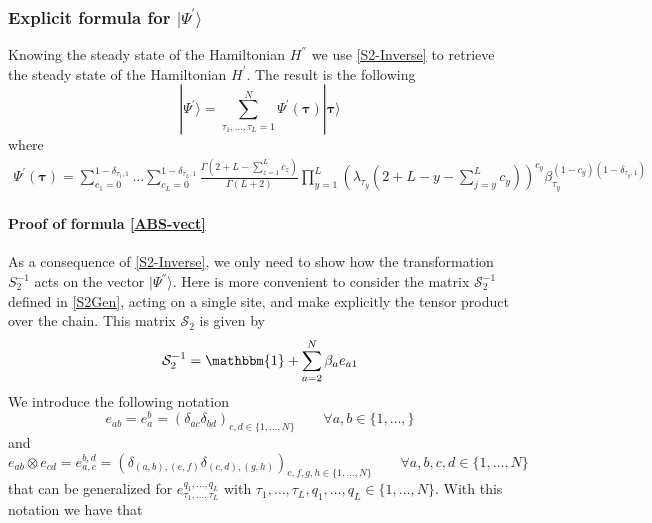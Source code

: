 \documentclass[10pt]{article}
\numberwithin{equation}{section}
\numberwithin{equation}{subsection}
\newcommand{\com}[1]{{ (* {\color{red}\small #1}*)}}
\begin{document}
\subsubsection{Explicit formula for $|\Psi^{'}\rangle$}\label{subsectionSSdual}
Knowing the steady state  of the Hamiltonian $H^{''}$ we use \eqref{S2-Inverse} to retrieve the steady state of the Hamiltonian $H^{'}$. The result is the following 
\begin{equation}\label{ABS-vect}
    |\Psi^{'}\rangle =\sum_{\tau_{1},\ldots,\tau_{L}=1}^{N}\Psi^{'}(\bm{\tau})|\bm{\tau}\rangle 
\end{equation}
where  
\begin{equation}\label{ABS}
		\begin{split}
			\Psi^{'}(\bm{\tau})=\sum_{c_{1}=0}^{1-\delta_{\tau_{1},1}}\ldots\sum_{c_{L}=0}^{1-\delta_{\tau_{L},1}}\frac{\Gamma(2+L-\sum_{z=1}^{L}c_{z})}{\Gamma(L+2)}\prod_{y=1}^{L}\left(\lambda_{\tau_{y}}\left(2+L-y-\sum_{j=y}^{L}c_{y}\right)\right)^{c_{y}}\beta_{\tau_{y}}^{(1-c_{y})(1-\delta_{\tau_{y},1})}
		\end{split}
	\end{equation} 
\paragraph{Proof of formula \eqref{ABS-vect}} As a consequence of \eqref{S2-Inverse}, we only need to show how the transformation $S_{2}^{-1}$ acts on the vector $|\Psi^{''}\rangle$. Here is more convenient to consider the matrix $\mathcal{S}_{2}^{-1}$ defined in \eqref{S2Gen}, acting on a single site, and make explicitly the tensor product over the chain. This matrix $\mathcal{S}_{2}$ is given by 
\begin{equation}
   \mathcal{S}_{2}^{-1}=\mathbbm{1}+\sum_{a=2}^{N}\beta_{a}e_{a1}
\end{equation}
We introduce the following notation
\begin{equation}\label{notation1}
    e_{ab}=e_{a}^{b}=\left(\delta_{ac}\delta_{bd}\right)_{c,d\in\{1,\ldots,N\}}\qquad \forall a,b\in \{1,\ldots,\}
\end{equation}
and 
\begin{equation}\label{notation2}
    e_{ab}\otimes e_{cd}=e_{a,c}^{b,d}=\left(\delta_{(a,b),(e,f)}\delta_{(c,d),(g,h)}\right)_{e,f,g,h\in \{1,\ldots,N\}}\qquad \forall a,b,c,d\in \{1,\ldots,N\}
    \end{equation}
    that can be generalized for $e_{\tau_{1},\ldots,\tau_{L}}^{q_{1},\ldots,q_{L}}$ with $\tau_{1},\ldots,\tau_{L},q_{1},\ldots,q_{L}\in \{1,\ldots,N\}$. With this notation we have that
    
\end{document}
